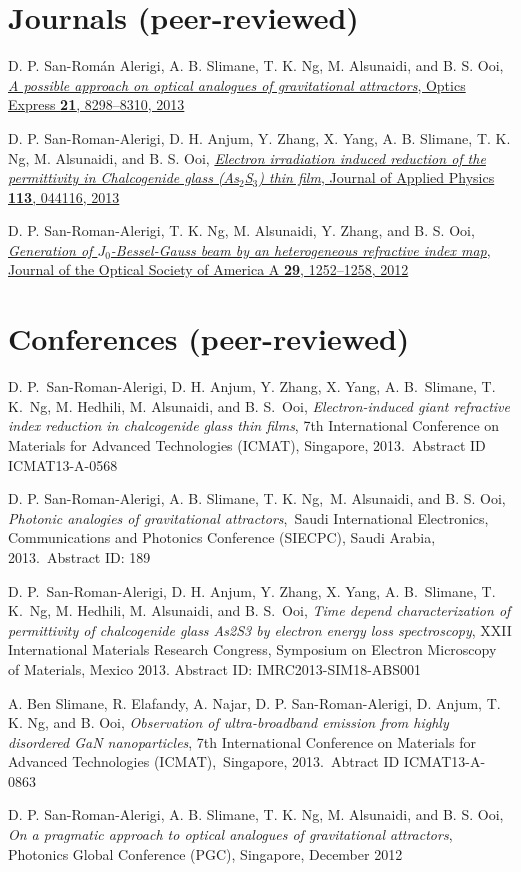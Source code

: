 \documentclass[margin,10pt]{res}
\newcommand{\subs}[1]{\normalfont #1}
\newcommand{\secs}[1]{\normalsize{\section{\subs{#1}}}}
\begin{document}
\secs{Journals (peer-reviewed)}
D. P. San-Román Alerigi, A. B. Slimane, T. K. Ng, M. Alsunaidi, and B. S. Ooi, \href{http://dx.doi.org/10.1364/OE.21.008298}{\emph{A possible approach on optical analogues of gravitational attractors}, Optics Express {\bf 21}, 8298--8310, 2013}

D. P. San-Roman-Alerigi, D. H. Anjum, Y. Zhang, X. Yang, A. B. Slimane, T. K. Ng, M. Alsunaidi, and B. S. Ooi, \href{http://link.aip.org/link/?JAP/113/044116}{\emph{Electron irradiation induced reduction of the permittivity in Chalcogenide glass (As$_2$S$_3$) thin film}, Journal of Applied Physics {\bf 113}, 044116, 2013}

D. P. San-Roman-Alerigi, T. K. Ng, M. Alsunaidi, Y. Zhang, and B. S. Ooi, \href{http://dx.doi.org/10.1364/JOSAA.29.001252}{\emph{Generation of $J_0$-Bessel-Gauss beam by an heterogeneous refractive index map}, Journal of the Optical Society of America A {\bf 29}, 1252--1258, 2012}


\secs{Conferences (peer-reviewed)}

D. P. San-Roman-Alerigi, D. H. Anjum, Y. Zhang, X. Yang, A. B. Slimane, T. K. Ng, M. Hedhili, M. Alsunaidi, and B. S. Ooi, \emph{Electron-induced giant refractive index reduction in chalcogenide glass thin films}, 7th International Conference on Materials for Advanced Technologies (ICMAT), Singapore, 2013. Abstract ID ICMAT13-A-0568

D. P. San-Roman-Alerigi, A. B. Slimane, T. K. Ng, M. Alsunaidi, and B. S. Ooi, \emph{Photonic analogies of gravitational attractors}, Saudi International Electronics, Communications and Photonics Conference (SIECPC), Saudi Arabia, 2013. Abstract ID: 189

D. P. San-Roman-Alerigi, D. H. Anjum, Y. Zhang, X. Yang, A. B. Slimane, T. K. Ng, M. Hedhili, M. Alsunaidi, and B. S. Ooi, \emph{Time depend characterization of permittivity of chalcogenide glass As2S3 by electron energy loss spectroscopy}, XXII International Materials Research Congress, Symposium on Electron Microscopy of Materials, Mexico 2013. Abstract ID: IMRC2013-SIM18-ABS001

A. Ben Slimane, R. Elafandy, A. Najar, D. P. San-Roman-Alerigi, D. Anjum, T. K. Ng, and B. Ooi, \emph{Observation of ultra-broadband emission from highly disordered GaN nanoparticles}, 7th International Conference on Materials for Advanced Technologies (ICMAT), Singapore, 2013. Abtract ID ICMAT13-A-0863

D. P. San-Roman-Alerigi, A. B. Slimane, T. K. Ng, M. Alsunaidi, and B. S. Ooi, \emph{On a pragmatic approach to optical analogues of gravitational attractors}, Photonics Global Conference (PGC), Singapore, December 2012
\end{document}
